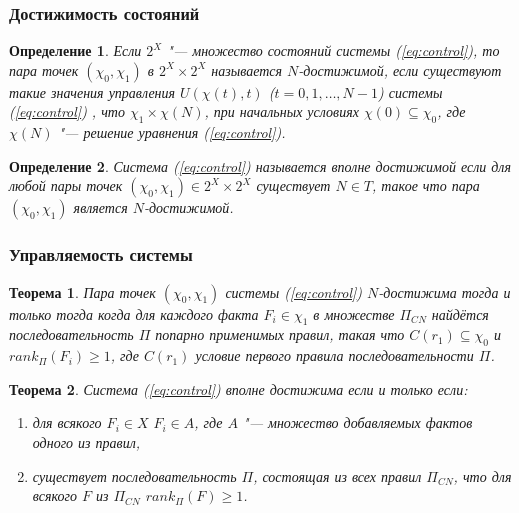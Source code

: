 \documentclass[default]{beamer}
\newtheorem{Theorem}{Теорема}
\newtheorem{Def}{Определение}
\begin{document}
		
	\begin{frame}
		\frametitle{Достижимость состояний}
		
		\begin{Def}
			Если $2^X$ "--- множество состояний системы (\ref{eq:control}), то пара точек $(\chi_0, \chi_1)$ в $2^X\times 2^X$  называется $N$-достижимой, если  существуют такие значения управления $U(\chi(t),t)$ ($t=0,1,\dots,N-1$) системы (\ref{eq:control}) , что $\chi_1\times\chi(N)$, при начальных условиях $\chi(0)\subseteq\chi_0$, где $\chi(N)$ "--- решение уравнения (\ref{eq:control}).
		\end{Def}
		\begin{Def}
			Система (\ref{eq:control}) называется вполне достижимой если для любой пары точек  $(\chi_0, \chi_1)\in 2^X\times 2^X$  существует $N\in T$, такое что пара $(\chi_0, \chi_1)$ является $N$-достижимой.
		\end{Def}
	\end{frame}

	\begin{frame}
		\frametitle{Управляемость системы}
		
		\begin{Theorem}
			Пара точек $(\chi_0, \chi_1)$ системы (\ref{eq:control})  $N$-достижима тогда и только тогда когда для каждого факта $F_i\in\chi_1$ в множестве $\Pi_{CN}$ найдётся последовательность $\Pi$ попарно применимых правил, такая что $C(r_1)\subseteq\chi_0$ и $rank_{\Pi}(F_i)\geqslant 1$, где $C(r_1)$ условие первого правила последовательности $\Pi$.
		\end{Theorem}
		
		\begin{Theorem}
			Система (\ref*{eq:control})  вполне достижима если и только если: 
			\begin{enumerate}
				\item для всякого $F_i\in X$ $F_i\in A$, где $A$ "--- множество добавляемых фактов одного из правил,
				\item существует последовательность $\Pi$, состоящая из всех правил $\Pi_{CN}$, что для всякого $F$ из $\Pi_{CN}$ $rank_{\Pi}(F)\geqslant 1$.
			\end{enumerate}
		\end{Theorem}
	\end{frame}
			
	
\end{document}

